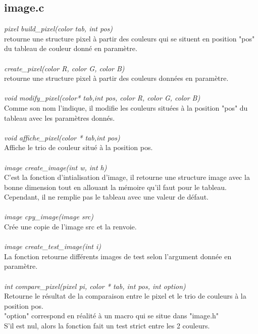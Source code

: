 \documentclass[12pt, letterpaper]{article}
\begin{document}
\subsection{image.c}
\textit{pixel build\_pixel(color \*tab, int pos)}\\
retourne une structure pixel à partir des couleurs qui se situent 
en position "pos" du tableau de couleur donné en paramètre.\\
\\
\textit{create\_pixel(color R, color G, color B)}\\
retourne une structure pixel à partir des couleurs données en paramètre.\\
\\
\textit{void modify\_pixel(color* tab,int pos, color R, color G, color B)}\\
Comme son nom l'indique, il modifie les couleurs situées à la position "pos" du tableau avec les paramètres donnés.\\
\\
\textit{void affiche\_pixel(color * tab,int pos)}\\
Affiche le trio de couleur situé à la position pos.
\\\\
\textit{image create\_image(int w, int h)}\\
C'est la fonction d'intialisation d'image, il retourne une structure image avec la bonne dimension
tout en allouant la mémoire qu'il faut pour le tableau. Cependant, il ne remplie pas le tableau avec une 
valeur de défaut.
\\\\
\textit{image cpy\_image(image src)}\\
Crée une copie de l'image src et la renvoie.
\\\\
\textit{image create\_test\_image(int i)}\\
La fonction retourne différents images de test selon l'argument donnée en paramètre.
\\\\
\textit{int compare\_pixel(pixel pi, color * tab, int pos, int option)}\\
Retourne le résultat de la comparaison entre le pixel et le trio de couleurs à la position pos.\\
"option" correspond en réalité à un macro qui se situe dans "image.h"\\
S'il est nul, alors la fonction fait un test strict entre les 2 couleurs.\\
\end{document}
